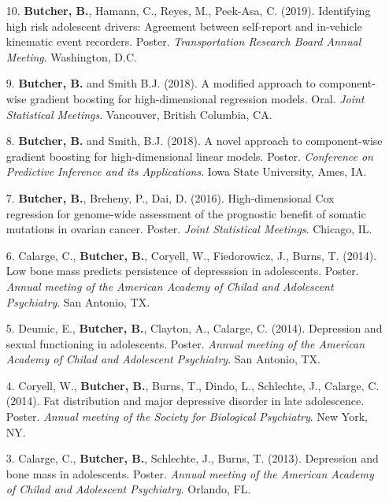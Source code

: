 \documentclass[a4paper]{article}
\begin{document}
\begin{enumerate}

  \item[10.] \textbf{Butcher, B.}, Hamann, C., Reyes, M., Peek-Asa, C. (2019).
    Identifying high risk adolescent drivers: Agreement between self-report
    and in-vehicle kinematic event recorders. Poster.
    \textit{Transportation Research Board Annual Meeting}. Washington, D.C.

  \item[9.] \textbf{Butcher, B.} and Smith B.J. (2018). A modified approach
    to component-wise gradient boosting for high-dimensional regression models.
    Oral. \textit{Joint Statistical Meetings}. Vancouver, British Columbia, CA.

  \item[8.] \textbf{Butcher, B.} and Smith, B.J. (2018). A novel approach to
    component-wise gradient boosting for high-dimensional linear models.
    Poster. \textit{Conference on Predictive Inference and its Applications}.
    Iowa State University, Ames, IA.

  \item[7.] \textbf{Butcher, B.}, Breheny, P., Dai, D. (2016).
    High-dimensional Cox regression for genome-wide assessment of the prognostic
    benefit of somatic mutations in ovarian cancer. Poster.
    \textit{Joint Statistical Meetings}. Chicago, IL.

  \item[6.] Calarge, C., \textbf{Butcher, B.}, Coryell, W., Fiedorowicz, J.,
    Burns, T. (2014). Low bone mass predicts persistence of depresssion in
    adolescents. Poster. \textit{Annual meeting of the
    American Academy of Chilad and Adolescent Psychiatry}. San Antonio, TX.

  \item[5.] Deumic, E., \textbf{Butcher, B.}, Clayton, A., Calarge, C. (2014).
    Depression and sexual functioning in adolescents. Poster. \textit{Annual meeting of the
    American Academy of Chilad and Adolescent Psychiatry}. San Antonio, TX.

  \item[4.] Coryell, W., \textbf{Butcher, B.}, Burns, T., Dindo, L., Schlechte, J.,
    Calarge, C. (2014). Fat distribution and major depressive disorder in late
    adolescence. Poster. \textit{Annual meeting of the Society for Biological Psychiatry}.
    New York, NY.

  \item[3.] Calarge, C., \textbf{Butcher, B.}, Schlechte, J., Burns, T. (2013).
    Depression and bone mass in adolescents. Poster. \textit{Annual meeting of the
    American Academy of Chilad and Adolescent Psychiatry}. Orlando, FL.


\end{enumerate}
\end{document}
